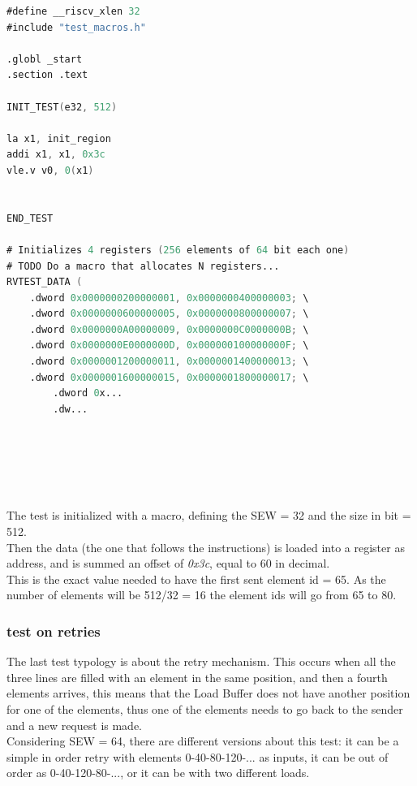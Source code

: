 \linespread{1}
\begin{lstlisting}[language=Verilog,style=verilog-style, backgroundcolor=\color{lyel_palette}, frame=tl]
#define __riscv_xlen 32
#include "test_macros.h"

.globl _start
.section .text

INIT_TEST(e32, 512)

la x1, init_region
addi x1, x1, 0x3c
vle.v v0, 0(x1)


END_TEST

# Initializes 4 registers (256 elements of 64 bit each one)
# TODO Do a macro that allocates N registers...
RVTEST_DATA (
	.dword 0x0000000200000001, 0x0000000400000003; \
	.dword 0x0000000600000005, 0x0000000800000007; \
	.dword 0x0000000A00000009, 0x0000000C0000000B; \
	.dword 0x0000000E0000000D, 0x000000100000000F; \
	.dword 0x0000001200000011, 0x0000001400000013; \
	.dword 0x0000001600000015, 0x0000001800000017; \
        .dword 0x...
        .dw...  

     
 

        
\end{lstlisting}
\linespread{1.2}

The test is initialized with a macro, defining the SEW = 32 and the size in bit = 512.\\
Then the data (the one that follows the instructions) is loaded into a register as address, and is summed an offset of \emph{0x3c}, equal to 60 in decimal.\\ This is the exact value needed to have the first sent element id = 65. As the number of elements will be 512/32 = 16 the element ids will go from 65 to 80.\\

\subsubsection{test on retries}
The last test typology is about the retry mechanism. This occurs when all the three lines are filled with an element in the same position, and then a fourth elements arrives, this means that the Load Buffer does not have another position for one of the elements, thus one of the elements needs to go back to the sender and a new request is made.\\

Considering SEW = 64, there are different versions about this test: it can be a simple in order retry with elements 0-40-80-120-... as inputs, it can be out of order as 0-40-120-80-..., or it can be with two different loads.\\

